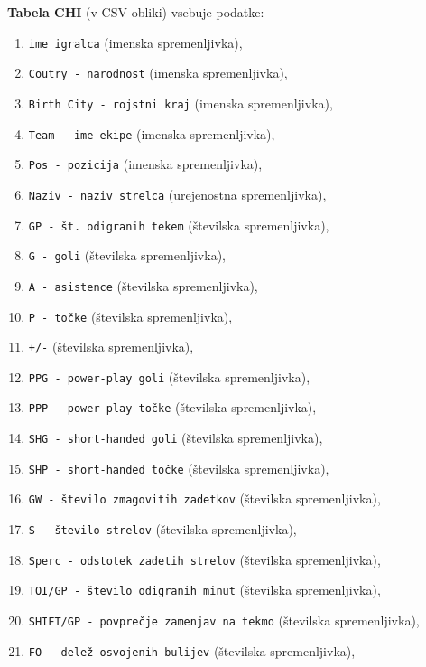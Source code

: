 \documentclass[11pt,a4paper]{article}
\begin{document}
\textbf{Tabela CHI} (v CSV obliki) vsebuje podatke:
\begin{enumerate}

\item{\verb|ime igralca| (imenska spremenljivka),}
\item{\verb|Coutry - narodnost| (imenska spremenljivka),}
\item{\verb|Birth City - rojstni kraj| (imenska spremenljivka),}
\item{\verb|Team - ime ekipe| (imenska spremenljivka),}
\item{\verb|Pos - pozicija| (imenska spremenljivka),}
\item{\verb|Naziv - naziv strelca| (urejenostna spremenljivka),}
\item{\verb|GP - št. odigranih tekem| (številska spremenljivka),}
\item{\verb|G - goli| (številska spremenljivka),}
\item{\verb|A - asistence| (številska spremenljivka),}
\item{\verb|P - točke| (številska spremenljivka),}
\item{\verb|+/-| (številska spremenljivka),}
\item{\verb|PPG - power-play goli| (številska spremenljivka),}
\item{\verb|PPP - power-play točke| (številska spremenljivka),}
\item{\verb|SHG - short-handed goli| (številska spremenljivka),}
\item{\verb|SHP - short-handed točke| (številska spremenljivka),}
\item{\verb|GW - število zmagovitih zadetkov| (številska spremenljivka),}
\item{\verb|S - število strelov| (številska spremenljivka),}
\item{\verb|Sperc - odstotek zadetih strelov| (številska spremenljivka),}
\item{\verb|TOI/GP - število odigranih minut| (številska spremenljivka),}
\item{\verb|SHIFT/GP - povprečje zamenjav na tekmo| (številska spremenljivka),}
\item{\verb|FO - delež osvojenih bulijev| (številska spremenljivka),}

\end{enumerate}
\end{document}
